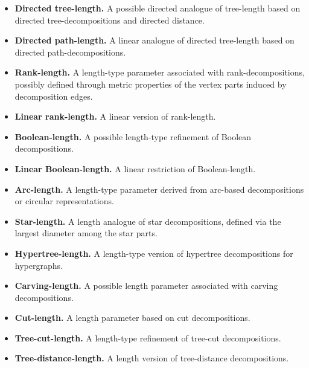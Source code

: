 \documentclass[10pt]{book}
\theoremstyle{definition}
\begin{document}
\begin{itemize}
    \item \textbf{Directed tree-length.}  
    A possible directed analogue of tree-length based on directed tree-decompositions and directed distance.

    \item \textbf{Directed path-length.}  
    A linear analogue of directed tree-length based on directed path-decompositions.

    \item \textbf{Rank-length.}  
    A length-type parameter associated with rank-decompositions, possibly defined through metric properties of the vertex parts induced by decomposition edges.

    \item \textbf{Linear rank-length.}  
    A linear version of rank-length.

    \item \textbf{Boolean-length.}  
    A possible length-type refinement of Boolean decompositions.

    \item \textbf{Linear Boolean-length.}  
    A linear restriction of Boolean-length.

    \item \textbf{Arc-length.}  
    A length-type parameter derived from arc-based decompositions or circular representations.

    \item \textbf{Star-length.}  
    A length analogue of star decompositions, defined via the largest diameter among the star parts.

    \item \textbf{Hypertree-length.}  
    A length-type version of hypertree decompositions for hypergraphs.

    \item \textbf{Carving-length.}  
    A possible length parameter associated with carving decompositions.

    \item \textbf{Cut-length.}  
    A length parameter based on cut decompositions.

    \item \textbf{Tree-cut-length.}  
    A length-type refinement of tree-cut decompositions.

    \item \textbf{Tree-distance-length.}  
    A length version of tree-distance decompositions.


\end{itemize}
\end{document}
